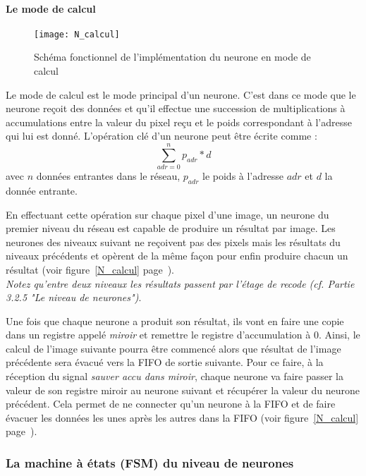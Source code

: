 	\paragraph{Le mode de calcul\\}
	\begin{figure}[h!]
		\begin{center}
			\texttt{[image: N\_calcul]}
			\caption{Schéma fonctionnel de l'implémentation du neurone en mode de calcul}
			\label{fig:N_calcul}
		\end{center}
	\end{figure}

	Le mode de calcul est le mode principal d'un neurone. C'est dans ce mode que le neurone
	reçoit des données et qu'il effectue une succession de multiplications à accumulations entre
	la valeur du pixel reçu et le poids correspondant à l'adresse qui lui est donné. L'opération clé
	d'un neurone peut être écrite comme :
	$$\sum_{adr=0}^n p_{adr}*d$$
	avec $n$ données entrantes dans le réseau, $p_{adr}$ le poids à l'adresse $adr$
	et $d$ la donnée entrante.

	En effectuant cette opération sur chaque pixel d'une image, un neurone du premier niveau du réseau
	est capable de produire un résultat par image. Les neurones des niveaux suivant ne reçoivent
	pas des pixels mais les résultats du niveaux précédents et opèrent de la même façon pour enfin
	produire chacun un résultat (voir figure~\ref{N_calcul} page~\pageref{N_calcul}).
	\\{\em Notez qu'entre deux niveaux les résultats passent par l'étage de recode
	(cf. Partie 3.2.5 "Le niveau de neurones")}.

	Une fois que chaque neurone a produit son résultat, ils vont en faire une copie dans
	un registre appelé {\em miroir} et remettre le registre d'accumulation à 0. Ainsi,
	le calcul de l'image suivante pourra être commencé alors que résultat de l'image précédente
	sera évacué vers la FIFO de sortie suivante. Pour ce faire, à la réception du signal
	{\em sauver accu dans miroir}, chaque neurone va faire passer la valeur de son
	registre miroir au neurone suivant et récupérer la valeur du neurone précédent.
	Cela permet de ne connecter qu'un neurone à la FIFO
	et de faire évacuer les données les unes après les autres dans la FIFO
	(voir figure~\ref{N_calcul} page~\pageref{N_calcul}).

\subsubsection{La machine à états (FSM) du niveau de neurones}

